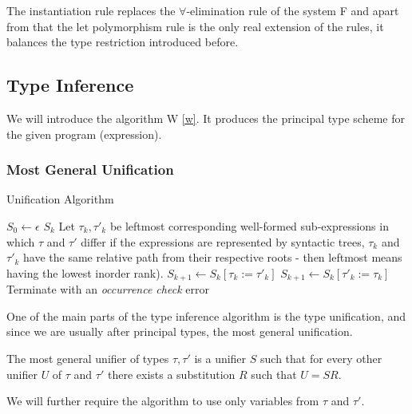 The instantiation rule replaces the $\forall$-elimination rule of the system F and apart from that the let polymorphism rule is the only real extension of the rules, it balances the type restriction introduced before.

\subsection{Type Inference}

We will introduce the algorithm W \ref{w}. It produces the principal type scheme for the given program (expression).

\subsubsection{Most General Unification}

\begin{algorithm}[t]
\caption{Unification Algorithm \cite{robinson1965machine}}
\label{mgu}
\begin{algorithmic}[1]
    \State $S_0 \gets \epsilon$
        \Return $S_k$
    \EndIf
    \State Let $\tau_k, \tau'_k$ be leftmost corresponding well-formed sub-expressions in which $\tau$ and $\tau'$ differ \Comment if the expressions are represented by syntactic trees, $\tau_k$ and $\tau'_k$ have the same relative path from their respective roots - then leftmost means having the lowest inorder rank).
        \State $S_{k+1} \gets S_k [\tau_k := \tau'_k]$
        \State $S_{k+1} \gets S_k [\tau'_k := \tau_k]$
    \Else
        \State Terminate with an \textit{occurrence check} error
    \EndIf
    \EndFor
\EndFunction
\end{algorithmic}
\end{algorithm}

One of the main parts of the type inference algorithm is the type unification, and since we are usually after principal types, the most general unification.

The most general unifier of types $\tau, \tau'$ is a unifier $S$ such that for every other unifier $U$ of $\tau$ and $\tau'$ there exists a substitution $R$ such that $U = S R$. \cite{damas1982principal}

We will further require the algorithm to use only variables from $\tau$ and $\tau'$.

